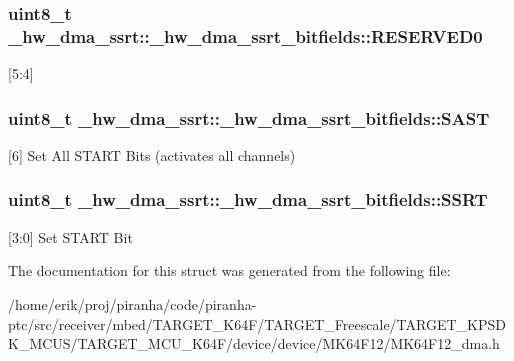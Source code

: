 \subsubsection[{\texorpdfstring{R\+E\+S\+E\+R\+V\+E\+D0}{RESERVED0}}]{\setlength{\rightskip}{0pt plus 5cm}uint8\+\_\+t \+\_\+hw\+\_\+dma\+\_\+ssrt\+::\+\_\+hw\+\_\+dma\+\_\+ssrt\+\_\+bitfields\+::\+R\+E\+S\+E\+R\+V\+E\+D0}\hypertarget{struct__hw__dma__ssrt_1_1__hw__dma__ssrt__bitfields_a5e66bf3464442a11762bd8c9379f2223}{}\label{struct__hw__dma__ssrt_1_1__hw__dma__ssrt__bitfields_a5e66bf3464442a11762bd8c9379f2223}
\mbox{[}5\+:4\mbox{]} 
\subsubsection[{\texorpdfstring{S\+A\+ST}{SAST}}]{\setlength{\rightskip}{0pt plus 5cm}uint8\+\_\+t \+\_\+hw\+\_\+dma\+\_\+ssrt\+::\+\_\+hw\+\_\+dma\+\_\+ssrt\+\_\+bitfields\+::\+S\+A\+ST}\hypertarget{struct__hw__dma__ssrt_1_1__hw__dma__ssrt__bitfields_a8bc83d3fb28f60b95f5ba7dcb5b6f614}{}\label{struct__hw__dma__ssrt_1_1__hw__dma__ssrt__bitfields_a8bc83d3fb28f60b95f5ba7dcb5b6f614}
\mbox{[}6\mbox{]} Set All S\+T\+A\+RT Bits (activates all channels) 
\subsubsection[{\texorpdfstring{S\+S\+RT}{SSRT}}]{\setlength{\rightskip}{0pt plus 5cm}uint8\+\_\+t \+\_\+hw\+\_\+dma\+\_\+ssrt\+::\+\_\+hw\+\_\+dma\+\_\+ssrt\+\_\+bitfields\+::\+S\+S\+RT}\hypertarget{struct__hw__dma__ssrt_1_1__hw__dma__ssrt__bitfields_ab7c33200e4f0caa44ec81cf08d269dca}{}\label{struct__hw__dma__ssrt_1_1__hw__dma__ssrt__bitfields_ab7c33200e4f0caa44ec81cf08d269dca}
\mbox{[}3\+:0\mbox{]} Set S\+T\+A\+RT Bit 

The documentation for this struct was generated from the following file\+:\begin{DoxyCompactItemize}
\item 
/home/erik/proj/piranha/code/piranha-\/ptc/src/receiver/mbed/\+T\+A\+R\+G\+E\+T\+\_\+\+K64\+F/\+T\+A\+R\+G\+E\+T\+\_\+\+Freescale/\+T\+A\+R\+G\+E\+T\+\_\+\+K\+P\+S\+D\+K\+\_\+\+M\+C\+U\+S/\+T\+A\+R\+G\+E\+T\+\_\+\+M\+C\+U\+\_\+\+K64\+F/device/device/\+M\+K64\+F12/M\+K64\+F12\+\_\+dma.\+h\end{DoxyCompactItemize}
